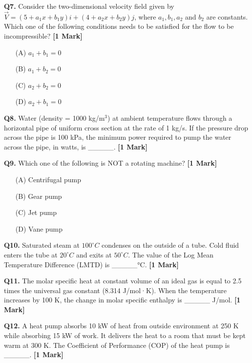 \documentclass[11pt]{article}
\newcommand{\questiona}[2]{
    \noindent\textbf{Q#2.} #1 \hfill \textbf{[1 Mark]}
}
\begin{document}
\questiona{Consider the two-dimensional velocity field given by \( \vec{V} = (5 + a_1 x + b_1 y)i + (4 + a_2 x + b_2 y)j \), where \( a_1, b_1, a_2 \) and \( b_2 \) are constants. Which one of the following conditions needs to be satisfied for the flow to be incompressible?}{7}
\begin{enumerate}
    \item[(A)] \( a_1 + b_1 = 0 \)
    \item[(B)] \( a_1 + b_2 = 0 \)
    \item[(C)] \( a_2 + b_2 = 0 \)
    \item[(D)] \( a_2 + b_1 = 0 \)
\end{enumerate}
\vspace{0.5cm}

\questiona{Water (density = 1000 kg/m\(^3\)) at ambient temperature flows through a horizontal pipe of uniform cross section at the rate of 1 kg/s. If the pressure drop across the pipe is 100 kPa, the minimum power required to pump the water across the pipe, in watts, is \_\_\_\_\_.}{8}
\vspace{0.5cm}

\questiona{Which one of the following is NOT a rotating machine?}{9}
\begin{enumerate}
    \item[(A)] Centrifugal pump
    \item[(B)] Gear pump
    \item[(C)] Jet pump
    \item[(D)] Vane pump
\end{enumerate}
\vspace{0.5cm}

\questiona{Saturated steam at \( 100^\circ C \) condenses on the outside of a tube. Cold fluid enters the tube at \( 20^\circ C \) and exits at \( 50^\circ C \). The value of the Log Mean Temperature Difference (LMTD) is \_\_\_\_\_°C.}{10}
\vspace{0.5cm}

\questiona{The molar specific heat at constant volume of an ideal gas is equal to 2.5 times the universal gas constant (8.314 J/mol·K). When the temperature increases by 100 K, the change in molar specific enthalpy is \_\_\_\_\_ J/mol.}{11}
\vspace{0.5cm}

\questiona{A heat pump absorbs 10 kW of heat from outside environment at 250 K while absorbing 15 kW of work. It delivers the heat to a room that must be kept warm at 300 K. The Coefficient of Performance (COP) of the heat pump is \_\_\_\_\_.}{12}
\vspace{0.5cm}
\end{document}
